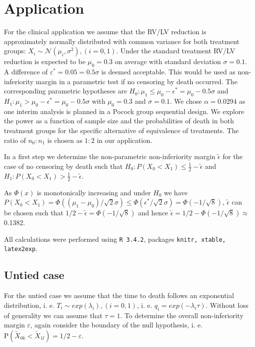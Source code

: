 \documentclass[bimj,fleqn]{w-art}\usepackage[]{graphicx}\usepackage[]{color}
\theoremstyle{plain}
\theoremstyle{definition}
\begin{document}
\section{Application}
\label{sec:Application}
  For the clinical application we assume that the RV/LV reduction is approximately normally distributed
with common variance for both treatment groups:
$X_i \sim \mathcal{N} ( \mu_i, \sigma^2 ), (i = 0, 1)$. Under the standard treatment RV/LV reduction
is expected to be $\mu_0 = 0.3$ on average with standard deviation $\sigma= 0.1$. A difference of
$\varepsilon^{*} = 0.05 = 0.5 \sigma$ is deemed acceptable. This would be used as non-inferiority
margin in a parametric test if no censoring by death occurred. The corresponding parametric hypotheses
are $H_0: \mu_1 \leq \mu_0 - \epsilon^{*}  = \mu_0 - 0.5 \sigma $ and
$H_1: \mu_1 > \mu_0 - \epsilon^{*} = \mu_0 - 0.5 \sigma $ with $\mu_0 = 0.3$ and $\sigma = 0.1$.
We chose $\alpha = 0.0294$ as one interim analysis is planned in a Pocock group sequential design.
We explore the power as a function of sample size and the probabilities of death in
both treatment groups for the specific alternative of equivalence of treatments.
The ratio of $n_0 : n_1$ is chosen as $1 : 2 $ in our application.

In a first step we determine the non-parametric non-inferiority margin $\tilde{\epsilon}$
for the case of no censoring by death such that
$H_0: P(X_0 < X_1) \leq \frac{1}{2} - \tilde{\epsilon}$ and
$H_1: P(X_0 < X_1) >  \frac{1}{2} - \tilde{\epsilon}$.

 As $\Phi(x)$ is monotonically increasing and under $H_0$ we have
 $P(X_0 < X_1) = \Phi((\mu_1 - \mu_0)/\sqrt{2}\sigma) \leq \Phi(\epsilon^{*}/ \sqrt{2}\sigma) = \Phi(-1/\sqrt{8}) $,
 $\tilde{\epsilon}$ can be chosen such that
 $1/2 - \tilde{\epsilon} = \Phi(-1/\sqrt{8}) $ and hence
 $\tilde{\epsilon} = 1/2 - \Phi(-1/\sqrt{8})  \approx $ 0.1382.

All calculations were performed using {\tt{R 3.4.2}}, packages {\tt{knitr, xtable, latex2exp}}.

\subsection{Untied case}
\label{sec:AppUntied}
For the untied case we assume that the time to death follows an exponential distribution, i. e.
$T_i \sim exp(\lambda_i), (i=0,1)$, i. e. $q_i = exp(-\lambda_i \tau)$. Without
loss of generality we can assume that $\tau = 1$. To determine the overall
non-inferiority margin $\varepsilon$, again consider the boundary of the null hypothesis,
i. e. $\text{P}(\widetilde{X}_{0k} < \widetilde{X}_{1l}) = 1/2 - \varepsilon $.
\end{document}
